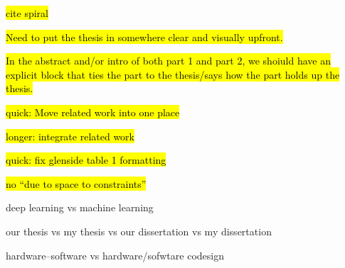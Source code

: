 \hl{cite spiral}

\hl{
Need to put the thesis in somewhere clear and visually upfront.
}

\hl{
In the abstract and/or intro of both part 1 and part 2, we shoiuld have an explicit block that ties the part to the thesis/says how the part holds up the thesis.
}

\hl{quick: Move related work into one place}

\hl{longer: integrate related work}

\hl{quick: fix glenside table 1 formatting}

\hl{no ``due to space to constraints''}

deep learning vs machine learning

our thesis vs my thesis vs our dissertation vs my dissertation

hardware--software vs hardware/sofwtare codesign

\clearpage